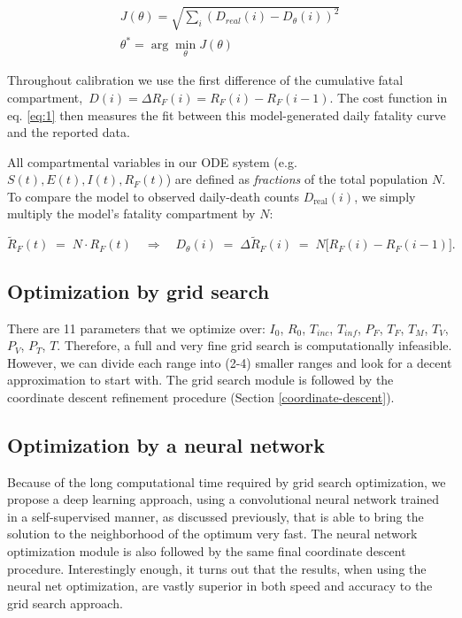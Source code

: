 \documentclass[11pt]{article}
\begin{document}
\begin{align}
    J(\theta) = \sqrt{\sum_i{(D_{real}(i) - D_{\theta}(i))^2}} \label{eq:1} \\
    \theta^* = \arg\min_{\theta} J(\theta) \label{eq:2}
\end{align}

Throughout calibration we use the first difference of the cumulative fatal compartment, $\,D(i)=\Delta R_F(i)=R_F(i)-R_F(i-1)$. The cost function in eq. \ref{eq:1} then measures the fit between this model-generated daily fatality curve and the reported data.

 All compartmental variables in our ODE system (e.g.\ $S(t),E(t),I(t),R_F(t)$) are defined as \emph{fractions} of the total population $N$.  To compare the model to observed daily‐death counts $D_{\text{real}}(i)$, we simply multiply the model’s fatality compartment by $N$:

    $$
      \widetilde{R}_F(t)\;=\;N\cdot R_F(t)
      \quad\Longrightarrow\quad
      D_\theta(i)\;=\;\Delta\widetilde{R}_F(i)
      \;=\;N\bigl[R_F(i)-R_F(i-1)\bigr].
    $$


\subsection{Optimization by grid search}
\label{sec:grid_search}

There are 11 parameters that we optimize over: $I_0$, $R_0$, $T_{inc}$, $T_{inf}$, $P_F$, $T_F$, $T_M$, $T_V$, $P_V$, $P_T$, $T$. Therefore, a full and very fine grid search is computationally infeasible. However, we can divide each range into (2-4) smaller ranges and look for a decent approximation to start with. The grid search module is followed by the coordinate descent refinement procedure (Section \ref{coordinate-descent}).

\subsection{Optimization by a neural network}
\label{sec:neural_net_optimization}

Because of the long computational time required by grid search optimization, we propose a deep learning approach, using a convolutional neural network trained in a self-supervised manner, as discussed previously, that is able to bring the solution to the neighborhood of the optimum very fast. The neural network optimization module is also followed by the same final coordinate descent procedure. Interestingly enough, it turns out that the results, when using the neural net optimization, are vastly superior in both speed and accuracy to the grid search approach.
\end{document}
